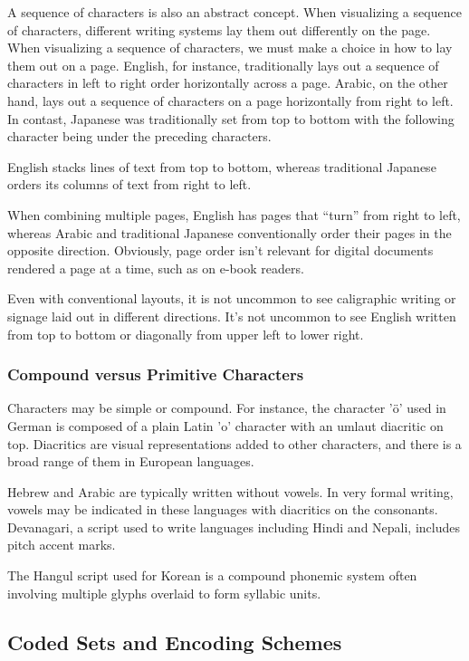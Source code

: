 A sequence of characters is also an abstract concept.  When
visualizing a sequence of characters, different writing systems lay
them out differently on the page.  When visualizing a sequence of
characters, we must make a choice in how to lay them out on a page.
English, for instance, traditionally lays out a sequence of characters
in left to right order horizontally across a page. 
Arabic, on the other hand, lays out a sequence of
characters on a page horizontally from right to left.  In contast,
Japanese was traditionally set from top to bottom with the following
character being under the preceding characters.

English stacks lines of text from top to bottom, whereas traditional
Japanese orders its columns of text from right to left.  

When combining multiple pages, English has pages that ``turn'' from
right to left, whereas Arabic and traditional Japanese conventionally
order their pages in the opposite direction.  Obviously, page order
isn't relevant for digital documents rendered a page at a time, such
as on e-book readers.

Even with conventional layouts, it is not uncommon to see caligraphic
writing or signage laid out in different directions.  It's not
uncommon to see English written from top to bottom or diagonally from
upper left to lower right.


\subsubsection{Compound versus Primitive Characters}

Characters may be simple or compound.  For instance, the character
'\"o' used in German is composed of a plain Latin 'o' character with
an umlaut diacritic on top.  Diacritics are visual representations
added to other characters, and there is a broad range of them in
European languages.  

Hebrew and Arabic are typically written without vowels.  In very
formal writing, vowels may be indicated in these languages with
diacritics on the consonants.  Devanagari, a script used to write
languages including Hindi and Nepali, includes pitch accent marks.

The Hangul script used for Korean is a compound phonemic system often
involving multiple glyphs overlaid to form syllabic units.


\subsection{Coded Sets and Encoding Schemes}

